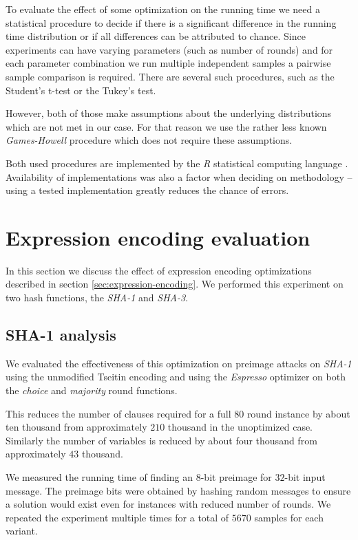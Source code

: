 To evaluate the effect of some optimization on the running time we need a statistical procedure to decide if there is a significant difference in the running time distribution or if all differences can be attributed to chance.
Since experiments can have varying parameters (such as number of rounds) and for each parameter combination we run multiple independent samples a pairwise sample comparison is required.
There are several such procedures, such as the Student's t-test or the Tukey's test.

However, both of those make assumptions about the underlying distributions which are not met in our case.
For that reason we use the rather less known \emph{Games-Howell} procedure \cite{games1976pairwise} which does not require these assumptions.

Both used procedures are implemented by the \emph{R} statistical computing language \cite{rteam2013}.
Availability of implementations was also a factor when deciding on methodology -- using a tested implementation greatly reduces the chance of errors.

\section{Expression encoding evaluation}
\label{sec:expression-encoding-eval}
In this section we discuss the effect of expression encoding optimizations described in section \ref{sec:expression-encoding}.
We performed this experiment on two hash functions, the \emph{SHA-1} and \emph{SHA-3}.

\subsection{SHA-1 analysis}
We evaluated the effectiveness of this optimization on preimage attacks on \emph{SHA-1} using the unmodified Tseitin encoding and using the \emph{Espresso} optimizer on both the \emph{choice} and \emph{majority} round functions.

This reduces the number of clauses required for a full $80$ round instance by about ten thousand from approximately $210$ thousand in the unoptimized case.
Similarly the number of variables is reduced by about four thousand from approximately $43$ thousand.

We measured the running time of finding an $8$-bit preimage for $32$-bit input message.
The preimage bits were obtained by hashing random messages to ensure a solution would exist even for instances with reduced number of rounds.
We repeated the experiment multiple times for a total of $5670$ samples for each variant.
 
